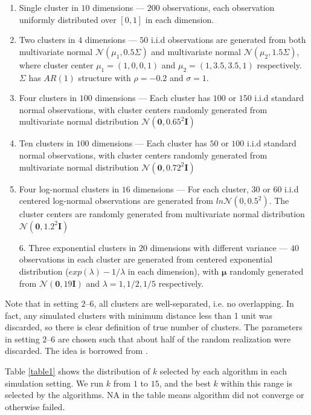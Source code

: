 \documentclass[12pt]{article}
\begin{document}
\begin{enumerate}
  \item Single cluster in $10$ dimensions --- $200$ observations, each
    observation uniformly distributed over $[0,1]$ in each dimension. 
  \item Two clusters in $4$ dimensions --- $50$ i.i.d
    observations are generated from both multivariate normal
    $\mathcal{N}\left(\mu_1,0.5\Sigma\right)$ and multivariate normal
    $\mathcal{N}\left(\mu_2,1.5\Sigma\right)$, where 
    cluster center $\mu_1 = (1,0,0,1)$ and $\mu_2 =(1,3.5,3.5,1)$
    respectively. $\Sigma$ has $AR(1)$ structure with $\rho=-0.2$ and $\sigma=1$.
  \item Four clusters in $100$ dimensions ---  Each cluster has $100$ or $150$
    i.i.d standard normal observations, with cluster centers randomly
    generated from multivariate normal distribution
    $\mathcal{N}\left(\mathbf{0},0.65^2\mathbf{I}\right)$
  \item Ten clusters in $100$ dimensions ---  Each cluster has $50$ or $100$
    i.i.d standard normal observations, with cluster centers randomly
    generated from multivariate normal distribution
    $\mathcal{N}\left(\mathbf{0},0.72^2\mathbf{I}\right)$
  \item Four log-normal clusters in $16$ dimensions --- For each cluster, $30$
    or $60$ i.i.d centered log-normal observations are generated from
    $ln\mathcal{N}\left(0,0.5^2 \right)$. The cluster centers are randomly
    generated from multivariate normal distribution
    $\mathcal{N}\left(\mathbf{0},1.2^2\mathbf{I}\right)$
  \item[6.] Three exponential clusters in $20$ dimensions with different
    variance --- $40$ observations in each cluster are generated from centered
    exponential distribution ($exp(\lambda)-1/\lambda$ in each dimension),
    with $\boldsymbol\mu$ randomly generated from
    $\mathcal{N}\left(\mathbf{0},19\mathbf{I}\right)$ and $\lambda = 1, 1/2,
    1/5$ respectively.
\end{enumerate}
Note that in setting $2$--$6$, all clusters are well-separated, i.e. no
overlapping. In fact, any simulated clusters with minimum distance less than
1 unit was discarded, so there is clear definition of true number of
clusters. The parameters in setting $2$--$6$ are chosen such that about half of
the random realization were discarded. The idea is borrowed from
\cite{tibshirani2001estimating}.

Table \ref{table1} shows the distribution of $k$ selected by each algorithm in 
each simulation setting. We run $k$ from $1$ to $15$, and the best $k$ within this range
is selected by the algorithms. NA in the table means algorithm did not converge or otherwise 
failed. 
\clearpage
\end{document}
